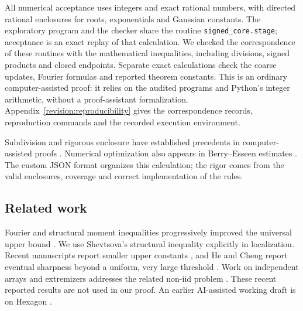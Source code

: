 All numerical acceptance uses integers and exact rational numbers,
with directed rational enclosures for roots, exponentials and Gaussian
constants. The exploratory program and the checker share the routine
\texttt{signed\_core.stage}; acceptance is an exact replay of that
calculation. We checked the correspondence of these routines with the
mathematical inequalities, including divisions, signed products and
closed endpoints. Separate exact calculations check the coarse updates,
Fourier formulas and reported theorem constants. This is an ordinary
computer-assisted proof: it relies on the audited programs and Python's
integer arithmetic, without a proof-assistant formalization.
Appendix~\ref{revision:reproducibility} gives the correspondence records,
reproduction commands and the recorded execution environment.

Subdivision and rigorous enclosure have established precedents in
computer-assisted proofs \cite{SolovyevHales2013}. Numerical optimization
also appears in Berry--Esseen estimates \cite[Section~2]{Shevtsova2011}.
The custom JSON format organizes this calculation; the rigor comes from
the valid enclosures, coverage and correct implementation of the rules.

\subsection{Related work}
Fourier and structural moment inequalities progressively improved the
universal upper bound \cite{vanBeek1972,Prawitz1972,Tyurin2010,
Shevtsova2011,Shevtsova2013}. We use Shevtsova's structural inequality
explicitly in localization. Recent manuscripts report smaller upper
constants \cite{xiao2026berryesseen,lin2026berryesseen}, and He and Cheng
report eventual sharpness beyond a uniform, very large threshold
\cite{hecheng2026eventually}. Work on independent arrays and extremizers
addresses the related non-iid problem \cite{BellIndependent2026,
BellExtremizers2026}. These recent reported results are not used in
our proof. An earlier AI-assisted working draft is on Hexagon
\cite{rodziewiczkolodziejek2026momentdefects}.
